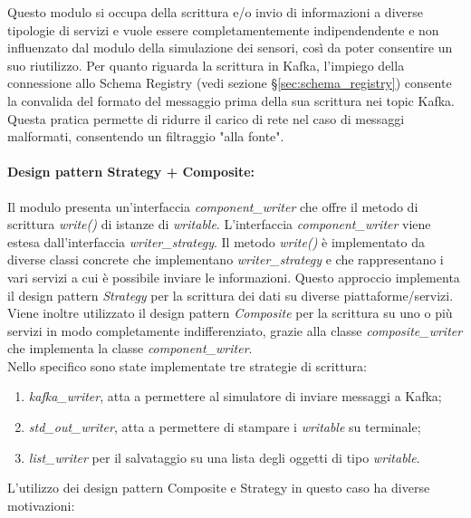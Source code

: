 Questo modulo si occupa della scrittura e/o invio di informazioni a diverse tipologie di servizi e vuole essere completamentemente indipendendente e non influenzato dal modulo della simulazione dei sensori, così da poter consentire un suo riutilizzo.
Per quanto riguarda la scrittura in Kafka, l'impiego della connessione allo Schema Registry (vedi sezione \S\ref{sec:schema_registry}) consente la convalida del formato del messaggio prima della sua scrittura nei topic Kafka. Questa pratica permette di ridurre il carico di rete nel caso di messaggi malformati, consentendo un filtraggio "alla fonte".

\paragraph{Design pattern Strategy + Composite:}
Il modulo presenta un'interfaccia \textit{component\_writer} che offre il metodo di scrittura \textit{write()} di istanze di \textit{writable}.
L'interfaccia \textit{component\_writer} viene estesa dall'interfaccia \textit{writer\_strategy}.
Il metodo \textit{write()} è implementato da diverse classi concrete che implementano \textit{writer\_strategy} e che rappresentano i vari servizi a cui è possibile inviare le informazioni.
Questo approccio implementa il design pattern \textit{Strategy} per la scrittura dei dati su diverse piattaforme/servizi. Viene inoltre utilizzato il design pattern \textit{Composite} per la scrittura su uno o più servizi in modo completamente indifferenziato, grazie alla classe \textit{composite\_writer} che implementa la classe \textit{component\_writer}. \\
Nello specifico sono state implementate tre strategie di scrittura: 
\begin{enumerate}
    \item \textit{kafka\_writer}, atta a permettere al simulatore di inviare messaggi a Kafka;
    \item \textit{std\_out\_writer}, atta a permettere di stampare i \textit{writable} su terminale;
    \item \textit{list\_writer} per il salvataggio su una lista degli oggetti di tipo \textit{writable}.
\end{enumerate}
L'utilizzo dei design pattern Composite e Strategy in questo caso ha diverse motivazioni:
